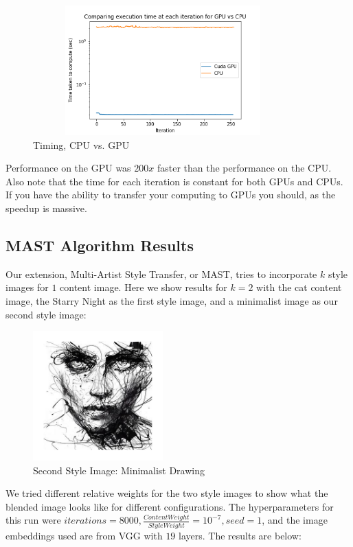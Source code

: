 \documentclass{article}
\begin{document}
\begin{figure}[H]
    \centering
    \includegraphics[height=5cm,width=10cm]{GPU_CPU_time_comparision}
    \caption{Timing, CPU vs. GPU}
    \label{fig:cpugpu}
\end{figure}

Performance on the GPU was $200x$ faster than the performance on the CPU. Also note that the time for each iteration is constant for both GPUs and CPUs. If you have the ability to transfer your computing to GPUs you should, as the speedup is massive.

\subsection{MAST Algorithm Results}

Our extension, Multi-Artist Style Transfer, or MAST, tries to incorporate $k$ style images for $1$ content image. Here we show results for $k = 2$ with the cat content image, the Starry Night as the first style image, and a minimalist image as our second style image:

\begin{figure}[H]
    \centering
    \includegraphics[height=5cm,width=5cm]{minimalistPrint}
    \caption{Second Style Image: Minimalist Drawing}
    \label{fig:cpugpu}
\end{figure}

We tried different relative weights for the two style images to show what the blended image looks like for different configurations. The hyperparameters for this run were $iterations = 8000, \frac{Content Weight}{Style Weight} = 10^{-7}, seed = 1$, and the image embeddings used are from VGG with $19$ layers. The results are below:
\end{document}

